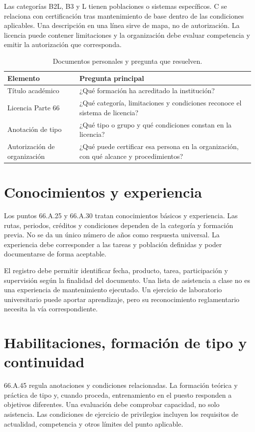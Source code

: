Las categorías B2L, B3 y L tienen poblaciones o sistemas específicos. C se relaciona con certificación tras mantenimiento de base dentro de las condiciones aplicables. Una descripción en una línea sirve de mapa, no de autorización. La licencia puede contener limitaciones y la organización debe evaluar competencia y emitir la autorización que corresponda.
\begin{table}[htbp]\centering\small\caption{Documentos personales y pregunta que resuelven.}\label{tab:personal}
\begin{tabular}{p{.26\linewidth}p{.59\linewidth}}\toprule
Elemento & Pregunta principal\\\midrule
Título académico & ¿Qué formación ha acreditado la institución?\\[4pt]
Licencia Parte 66 & ¿Qué categoría, limitaciones y condiciones reconoce el sistema de licencia?\\[4pt]
Anotación de tipo & ¿Qué tipo o grupo y qué condiciones constan en la licencia?\\[4pt]
Autorización de organización & ¿Qué puede certificar esa persona en la organización, con qué alcance y procedimientos?\\\bottomrule
\end{tabular}\end{table}
\section{Conocimientos y experiencia}
Los puntos 66.A.25 y 66.A.30 tratan conocimientos básicos y experiencia. Las rutas, periodos, créditos y condiciones dependen de la categoría y formación previa. No se da un único número de años como respuesta universal. La experiencia debe corresponder a las tareas y población definidas y poder documentarse de forma aceptable.

El registro debe permitir identificar fecha, producto, tarea, participación y supervisión según la finalidad del documento. Una lista de asistencia a clase no es una experiencia de mantenimiento ejecutado. Un ejercicio de laboratorio universitario puede aportar aprendizaje, pero su reconocimiento reglamentario necesita la vía correspondiente.
\section{Habilitaciones, formación de tipo y continuidad}
66.A.45 regula anotaciones y condiciones relacionadas. La formación teórica y práctica de tipo y, cuando proceda, entrenamiento en el puesto responden a objetivos diferentes. Una evaluación debe comprobar capacidad, no solo asistencia. Las condiciones de ejercicio de privilegios incluyen los requisitos de actualidad, competencia y otros límites del punto aplicable.

